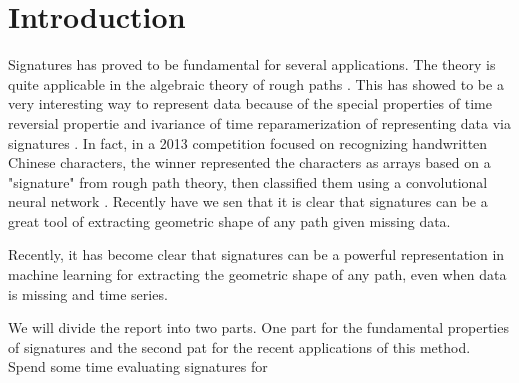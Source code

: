 \section{Introduction}\label{sec:introduction}


Signatures has proved to be fundamental for several applications.
The theory is quite applicable in the algebraic theory of rough paths \cite{geng2021introduction}. This has showed to be a very interesting way to represent data because of the special properties of time reversial propertie and ivariance of time
reparamerization of representing data via signatures \cite{chevyrev2016primer}. In fact, in a
2013 competition focused on recognizing handwritten
Chinese characters, the winner represented the characters as arrays based on a "signature" from rough path theory, then classified them using a convolutional neural network \cite{yin2013icdar}.
Recently have we sen that it is clear that signatures can be a great tool of extracting geometric shape of any path given missing data.

Recently, it has become clear that signatures can be a powerful representation in machine learning for extracting the geometric shape of any path, even when data is missing \cite{chevyrev2016primer} and time series.


We will divide the report into two parts. One part for the fundamental properties of signatures and the second pat for the recent applications of this method. Spend some time evaluating signatures for




